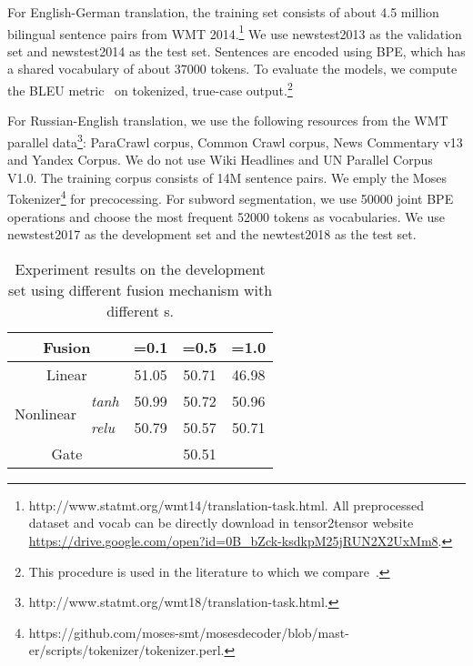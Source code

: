 \documentclass[11pt,a4paper]{article}
\begin{document}
\begin{CJK*}{UTF8}{gbsn}
For English-German translation, the training set consists of about 4.5 million bilingual sentence pairs from WMT 2014.{\footnote[5]{http://www.statmt.org/wmt14/translation-task.html. All preprocessed dataset and vocab can be directly download in tensor2tensor website \url{https://drive.google.com/open?id=0B_bZck-ksdkpM25jRUN2X2UxMm8}.}}
We use newstest2013 as the validation set and newstest2014 as the test set.
Sentences are encoded using BPE, which has a shared vocabulary of about 37000 tokens.
To evaluate the models, we compute the BLEU metric~\cite{P02-1040} on tokenized, true-case output.{\footnote[6]{This procedure is used in the literature to which we compare~\cite{Wu:2016, gehring2017convolutional, vaswani2017attention}.}}

For Russian-English translation, we use the following resources from the WMT parallel data{\footnote[7]{http://www.statmt.org/wmt18/translation-task.html.}}: ParaCrawl corpus, Common Crawl corpus, News Commentary v13 and Yandex Corpus. We do not use Wiki Headlines and UN Parallel Corpus V1.0. The training corpus consists of 14M sentence pairs. We emply the Moses Tokenizer{\footnote[8]{https://github.com/moses-smt/mosesdecoder/blob/mast-er/scripts/tokenizer/tokenizer.perl.}} for precocessing. For subword segmentation, we use 50000 joint BPE operations and choose the most frequent 52000 tokens as vocabularies. We use newstest2017 as the development set and the newtest2018 as the test set.


\begin{table}
	\centering
	\begin{tabular}{|l|l||c|c|c|}
		\hline
		\multicolumn{2}{|c||}{Fusion}       &     =0.1  & =0.5   & =1.0   \\
		\hline
		\hline
		\multicolumn{2}{|c||}{Linear}                  &     51.05     & 50.71 &  46.98    \\
		\hline
		\multirow{2}{*}{Nonlinear}        &\textit{tanh} &     50.99   &     50.72    &   50.96    \\  \cline{2-5}
		&\textit{relu} &     50.79   &     50.57      &   50.71         \\
		\hline
		\multicolumn{2}{|c||}{Gate}                    &      \multicolumn{3}{c|}{50.51}        \\
		\hline
	\end{tabular}
	\caption{Experiment results on the development set using different fusion mechanism with different s.} \label{acg-table}
\end{table}


\end{CJK*}
\end{document}
